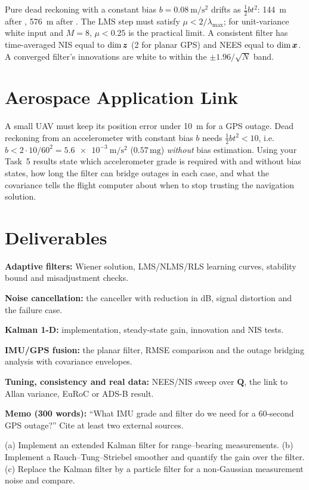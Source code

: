 \documentclass[11pt,a4paper]{article}
\begin{document}
\begin{checkpoint}
Pure dead reckoning with a constant bias $b=\SI{0.08}{\metre\per\second\squared}$ drifts as $\tfrac12bt^2$: \SI{144}{\metre} after , \SI{576}{\metre} after . The LMS step must satisfy $\mu<2/\lambda_{\max}$; for unit-variance white input and $M=8$, $\mu<0.25$ is the practical limit. A consistent filter has time-averaged NIS equal to $\dim\bm{z}$ (2 for planar GPS) and NEES equal to $\dim\bm{x}$. A converged filter's innovations are white to within the $\pm1.96/\sqrt N$ band.
\end{checkpoint}

\section*{Aerospace Application Link}
A small UAV must keep its position error under \SI{10}{\metre} for a  GPS outage. Dead reckoning from an accelerometer with constant bias $b$ needs $\tfrac12bt^2<10$, i.e.\ $b<2\cdot10/60^2=\SI{5.6e-3}{\metre\per\second\squared}$ ($0.57\,\mathrm{mg}$) \emph{without} bias estimation. Using your Task~5 results state which accelerometer grade is required with and without bias states, how long the filter can bridge outages in each case, and what the covariance tells the flight computer about when to stop trusting the navigation solution.

\section*{Deliverables}
\begin{delivs}
  \item[D1] \textbf{Adaptive filters:} Wiener solution, LMS/NLMS/RLS learning curves, stability bound and misadjustment checks.
  \item[D2] \textbf{Noise cancellation:} the canceller with reduction in dB, signal distortion and the failure case.
  \item[D3] \textbf{Kalman 1-D:} implementation, steady-state gain, innovation and NIS tests.
  \item[D4] \textbf{IMU/GPS fusion:} the planar filter, RMSE comparison and the outage bridging analysis with covariance envelopes.
  \item[D5] \textbf{Tuning, consistency and real data:} NEES/NIS sweep over $\mathbf Q$, the link to Allan variance, EuRoC or ADS-B result.
  \item[D6] \textbf{Memo (300 words):} ``What IMU grade and filter do we need for a 60-second GPS outage?'' Cite at least two external sources.
  \item[Bonus] (a) Implement an extended Kalman filter for range--bearing measurements. (b) Implement a Rauch--Tung--Striebel smoother and quantify the gain over the filter. (c) Replace the Kalman filter by a particle filter for a non-Gaussian measurement noise and compare.
\end{delivs}
\end{document}
